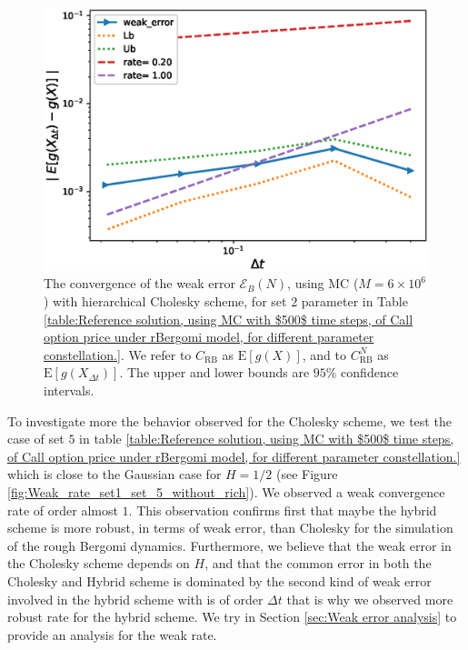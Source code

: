 \documentclass[11pt]{article}
\newcommand{\expt}[1]{\mathrm{E}\left[#1\right]}
\begin{document}
\FloatBarrier
\begin{figure}[h!]
	\centering
		\includegraphics[width=0.6\linewidth]{./figures/rBergomi_weak_error_cholesky/weak_convergence_order_Bergomi_H_002_K_1_M_6_10_6_CI_relative_cholesky_hierarchical}
		
	\caption{The  convergence of the weak error $\mathcal{E}_B(N)$, using MC ($M=6 \times 10^6$) with hierarchical Cholesky scheme, for set $2$ parameter in Table \ref{table:Reference solution, using MC with $500$ time steps, of Call option price under rBergomi model, for different parameter constellation.}. We refer to $C_{\text{RB}}$ as $\expt{g(X)}$, and to $C_{\text{RB}}^{N}$ as  $\expt{g(X_{\Delta t})}$. The upper and lower bounds are $95\%$ confidence intervals.}
	\label{fig:Weak_rate_set2_without_rich_cholesky}
\end{figure}
\FloatBarrier


To investigate more the behavior observed for the Cholesky scheme, we test the case of set $5$ in table \ref{table:Reference solution, using MC with $500$ time steps, of Call option price under rBergomi model, for different parameter constellation.} which is close to the Gaussian case for $H=1/2$ (see Figure \ref{fig:Weak_rate_set1_set_5_without_rich}). We observed a weak convergence rate of order almost $1$. This observation confirms first that maybe the hybrid scheme is more robust, in terms of weak error, than Cholesky for the simulation of the rough Bergomi dynamics. Furthermore, we believe that the weak error in the Cholesky scheme depends on $H$, and  that the common error in both the Cholesky and Hybrid scheme is dominated by the second kind of weak error involved in the hybrid scheme with is of order $\Delta t $ that is why we observed more robust rate for the hybrid scheme. We try in Section \ref{sec:Weak error analysis} to provide an analysis for the weak rate.
\end{document}
